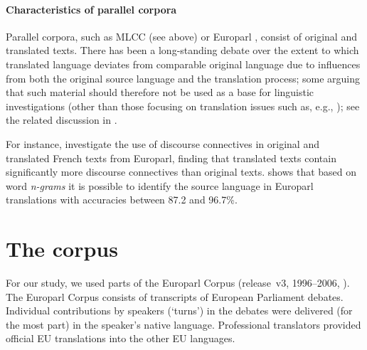 \documentclass[output=paper]{LSP/langsci}
\begin{document}

\paragraph*{Characteristics of parallel corpora} %

Parallel corpora, such as MLCC (see above) or Europarl \citep{koehn05}, consist of original and translated texts. There has been a long-standing debate over the extent to which translated language deviates from comparable original language due to influences from both the original source language and the translation process; some arguing that such material should therefore not be used as a base for linguistic investigations (other than those focusing on translation issues such as, e.g., \citealt{culo:et:al2008}); see the related discussion in . 

For instance, \cite{cartoni11} investigate the use of discourse connectives in original and translated French texts from Europarl, finding that translated texts contain significantly more discourse connectives than original texts. \cite{vanHalteren08} shows that based on word \emph{n-grams} it is possible to identify the source language in Europarl translations with accuracies between 87.2 and 96.7\%. 





\section{The corpus}
\label{sec:corpus}
For our study, we used parts of the Europarl Corpus (release~v3, 1996--2006, \citealt{koehn05}). The Europarl Corpus consists of transcripts of European Parliament debates. Individual contributions by speakers (`turns') in the debates were delivered (for the most part) in the speaker's native language. Professional translators provided official EU translations into the other EU languages.
\end{document}
